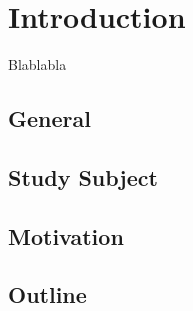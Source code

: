 \chapter{Introduction}

Blablabla

\section{General}

\section{Study Subject}

\section{Motivation}

\section{Outline}
